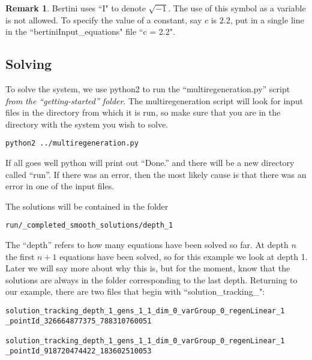 \documentclass[12pt]{article}
\theoremstyle{definition}
\newtheorem{remark}{Remark}[section]
\begin{document}
\begin{remark}
Bertini uses ``I" to denote $\sqrt{-1}$. The use of this symbol as a variable is not allowed. 
To specify the value of a constant, say $c$ is $2.2$, put in a single line in the ``bertiniInput\_equations" file ``c = 2.2".


\end{remark}


\subsection{Solving}
To solve the system, we use python2 to run the ``multiregeneration.py'' 
script \emph{from the ``getting-started'' folder}. The multiregeneration 
script will look for input files in the directory from which it is run, 
so make sure that you are in the directory with the system you wish to 
solve. 


\begin{leftbar}
\vspace{-10pt} 
\begin{verbatim}
python2 ../multiregeneration.py
\end{verbatim}\vspace{-10pt} 
\end{leftbar}

If all goes well python will print out ``Done.'' and there will be 
a new directory called ``run''. If there was an error, then the most 
likely cause is that there was an error in one of the input files.

The solutions will be contained in the folder 

\begin{leftbar}
\vspace{-10pt} 
\begin{verbatim}
run/_completed_smooth_solutions/depth_1
\end{verbatim}\vspace{-10pt} 
\end{leftbar}

The ``depth'' refers to how many equations have been solved so far. At 
depth $n$ the first $n+1$ equations have been solved, so for this 
example we look at depth 1. Later we will say more about why this is, 
but for the moment, know that the solutions are always in the folder 
corresponding to the last depth. Returning to our example, there are two 
files that begin with   ``solution\_tracking\_": 

\begin{leftbar}
\vspace{-10pt} 
\begin{verbatim}
solution_tracking_depth_1_gens_1_1_dim_0_varGroup_0_regenLinear_1
_pointId_326664877375_788310760051

solution_tracking_depth_1_gens_1_1_dim_0_varGroup_0_regenLinear_1
_pointId_918720474422_183602510053 
\end{verbatim}\vspace{-10pt} 
\end{leftbar}
\end{document}
